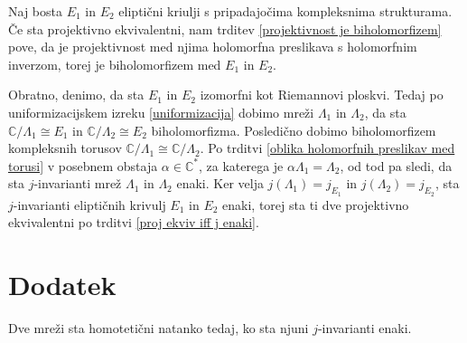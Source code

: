 \documentclass[mat1]{fmfdelo}
\numberwithin{equation}{section}
\newcommand{\C}{\mathbb C}
\newcommand{\CM}{\mathbb C ^*}
\newcommand{\iso}{\cong}
\theoremstyle{definition}
\begin{document}
\begin{dokaz}
    Naj bosta $E_1$ in $E_2$ eliptični kriulji s pripadajočima kompleksnima strukturama. Če sta projektivno ekvivalentni, nam trditev \ref{projektivnost je biholomorfizem} pove, da je projektivnost med njima holomorfna preslikava s holomorfnim inverzom, torej je biholomorfizem med $E_1$ in $E_2$.

    Obratno, denimo, da sta $E_1$ in $E_2$ izomorfni kot Riemannovi ploskvi. Tedaj po uniformizacijskem izreku \ref{uniformizacija} dobimo mreži $\Lambda_1$ in $\Lambda_2$, da sta $\C/\Lambda_1 \iso E_1$ in $\C/\Lambda_2 \iso E_2$ biholomorfizma. Posledično dobimo biholomorfizem kompleksnih torusov $\C/\Lambda_1 \iso \C/\Lambda_2$. Po trditvi \ref{oblika holomorfnih preslikav med torusi} v posebnem obstaja $\alpha \in \CM$, za katerega je $\alpha\Lambda_1 = \Lambda_2$, od tod pa sledi, da sta $j$-invarianti mrež $\Lambda_1$ in $\Lambda_2$ enaki. Ker velja $j(\Lambda_1) = j_{E_1}$ in $j(\Lambda_2) = j_{E_2}$, sta $j$-invarianti eliptičnih krivulj $E_1$ in $E_2$ enaki, torej sta ti dve projektivno ekvivalentni po trditvi \ref{proj ekviv iff j enaki}.
\end{dokaz}


\section{Dodatek}

\begin{trditev}
    \label{ekvivalentni mrezi -- isti j}
    Dve mreži sta homotetični natanko tedaj, ko sta njuni $j$-invarianti enaki. 
\end{trditev}
\end{document}
